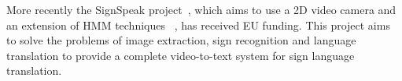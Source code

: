 More recently the SignSpeak project~\citep{dreuw2010signspeak}, which aims to use a 2D video camera and an extension of HMM techniques ~\citep{dreuw2009smoothed}, has received EU funding. This project aims to solve the problems of image extraction, sign recognition and language translation to provide a complete video-to-text system for sign language translation.



